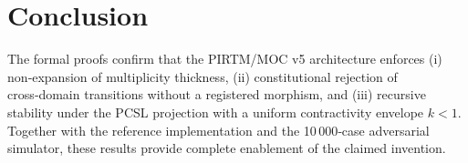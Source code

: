 \documentclass[11pt,a4paper]{article}
\theoremstyle{definition}
\theoremstyle{remark}
\begin{document}
\section{Conclusion}
The formal proofs confirm that the PIRTM/MOC v5 architecture enforces (i) non‑expansion of multiplicity thickness, (ii) constitutional rejection of cross‑domain transitions without a registered morphism, and (iii) recursive stability under the PCSL projection with a uniform contractivity envelope $k<1$. Together with the reference implementation and the 10 000‑case adversarial simulator, these results provide complete enablement of the claimed invention.



\nocite{*}
  
 
\end{document}
